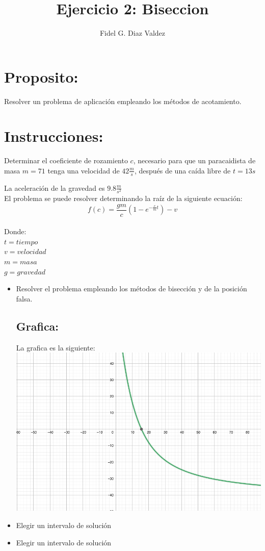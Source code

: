 \documentclass{article}
\begin{document}
\begin{titlepage}
\title{Ejercicio 2: Biseccion}
\author{Fidel G. Diaz Valdez}
\maketitle
\section*{Proposito:}
Resolver un problema de aplicación empleando los métodos de acotamiento.
\section*{Instrucciones:}

Determinar el coeficiente de rozamiento $ c $, necesario para que un paracaidista de masa $m = 71$ tenga una velocidad de $42 \frac{m}{s}$, después de una caída libre de $t = 13 s$

La aceleración de la gravedad es $9.8\frac{m}{s^2}$
\\
El problema se puede resolver determinando la raíz de la siguiente ecuación: 
\begin{equation}
f(c)= \frac{gm}{c}(1- e^{-\frac{c}{m}t})-v
\end{equation}
\\
Donde:\\$t=tiempo$ \\$v=velocidad$ \\$m=masa$ \\$g=gravedad$
\end{titlepage}
\begin{itemize}
    \item Resolver el problema empleando los métodos de bisección y de la posición falsa.
    \subsection*{Grafica:}    
    La grafica es la siguiente: \\
    \includegraphics[width=1\linewidth]{Grafica}





    \item Elegir un intervalo de solución
    \item  Elegir un intervalo de solución
\end{itemize}
    
\end{document}
